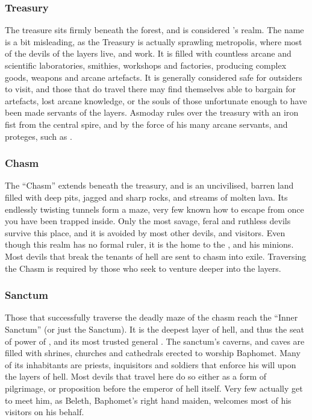 \subsubsection{Treasury}
\label{sec:Treasury}

The treasure sits firmly beneath the forest, and is considered
's realm. The name is a bit misleading, as the Treasury
is actually sprawling metropolis, where most of the devils of the layers live,
and work. It is filled with countless arcane and scientific laboratories,
smithies, workshops and factories, producing complex goods, weapons and arcane
artefacts. It is generally considered safe for outsiders to visit, and those
that do travel there may find themselves able to bargain for artefacts, lost
arcane knowledge, or the souls of those unfortunate enough to have been made
servants of the layers. Asmoday rules over the treasury with an iron fist from
the central spire, and by the force of his many arcane servants, and proteges,
such as .

\subsubsection{Chasm}
\label{sec:Chasm}

The ``Chasm'' extends beneath the treasury, and is an uncivilised, barren land
filled with deep pits, jagged and sharp rocks, and streams of molten lava. Its
endlessly twisting tunnels form a maze, very few known how to escape from once
you have been trapped inside. Only the most savage, feral and ruthless devils
survive this place, and it is avoided by most other devils, and visitors. Even
though this realm has no formal ruler, it is the home to the
, and his minions. Most devils that break the tenants
of hell are sent to chasm into exile. Traversing the Chasm is required by
those who seek to venture deeper into the layers.

\subsubsection{Sanctum}
\label{sec:Sanctum}

Those that successfully traverse the deadly maze of the chasm reach the
``Inner Sanctum'' (or just the Sanctum). It is the deepest layer of hell,
and thus the seat of power of , and its most trusted
general . The sanctum's caverns, and caves are filled with
shrines, churches and cathedrals erected to worship Baphomet. Many of its
inhabitants are priests, inquisitors and soldiers that enforce his will upon
the layers of hell. Most devils that travel here do so either as a form of
pilgrimage, or proposition before the emperor of hell itself. Very few
actually get to meet him, as Beleth, Baphomet's right hand maiden, welcomes
most of his visitors on his behalf.
